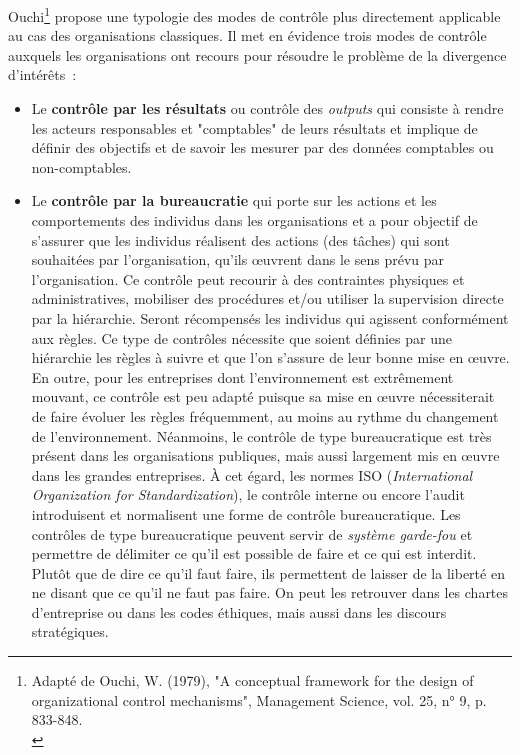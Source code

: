 \documentclass{tufte-handout}
\begin{document}
\begin{enumerate}
Ouchi\footnote{Adapté de Ouchi, W. (1979), "A conceptual framework for the design of organizational control mechanisms", Management Science, vol. 25, n° 9, p. 833-848.\\} propose une typologie des modes de contrôle plus directement applicable au cas des organisations classiques. Il met en évidence trois modes de contrôle auxquels les organisations ont recours pour résoudre le problème de la divergence d'intérêts :\\
\begin{itemize}
\item Le \textbf{contrôle par les résultats} ou contrôle des \emph{outputs} qui consiste à rendre les acteurs responsables et "comptables" de leurs résultats et implique de définir des objectifs et de savoir les mesurer par des données comptables ou non-comptables.\\
\item Le \textbf{contrôle par la bureaucratie} qui porte sur les actions et les comportements des individus dans les organisations et a pour objectif de s'assurer que les individus réalisent des actions (des tâches) qui sont souhaitées par l'organisation, qu'ils œuvrent dans le sens prévu par l'organisation. Ce contrôle peut recourir à des contraintes physiques et administratives, mobiliser des procédures et/ou utiliser la supervision directe par la hiérarchie. Seront récompensés les individus qui agissent conformément aux règles. Ce type de contrôles nécessite que soient définies par une hiérarchie les règles à suivre et que l'on s'assure de leur bonne mise en œuvre. En outre, pour les entreprises dont l'environnement est extrêmement mouvant, ce contrôle est peu adapté puisque sa mise en œuvre nécessiterait de faire évoluer les règles fréquemment, au moins au rythme du changement de l'environnement. Néanmoins, le contrôle de type bureaucratique est très présent dans les organisations publiques, mais aussi largement mis en œuvre dans les grandes entreprises. À cet égard, les normes ISO (\emph{International Organization for Standardization}), le contrôle interne ou encore l'audit introduisent et normalisent une forme de contrôle bureaucratique. Les contrôles de type bureaucratique peuvent servir de \emph{système garde-fou} et permettre de délimiter ce qu'il est possible de faire et ce qui est interdit. Plutôt que de dire ce qu'il faut faire, ils permettent de laisser de la liberté en ne disant que ce qu'il ne faut pas faire. On peut les retrouver dans les chartes d'entreprise ou dans les codes éthiques, mais aussi dans les discours stratégiques.\\

\end{itemize}
\end{enumerate}
\end{document}
